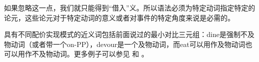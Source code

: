 \begin{exe}
\begin{xlist}[iv.]
\begin{exe}
\begin{xlist}[iv.]
\zl
如果忽略这一点，我们就只能得到“借入”义。所以语法必须为特定动词指定特定的论元，这些论元对于特定动词的意义或者对事件的特定角度来说是必需的。

具有不同配价实现模式的近义词包括前面说过的最小对比三元组：dine是强制不及物动词（或者带一个on-PP），devour是一个及物动词，而eat可以用作及物动词也可以用作不及物动词\citep[--90]{Dowty89b-u}。更多例子可以参见 \citet{Levin93a-u}和 \citet{LRH2005a-u}。
%


\end{xlist}
\end{exe}
\end{xlist}
\end{exe}
